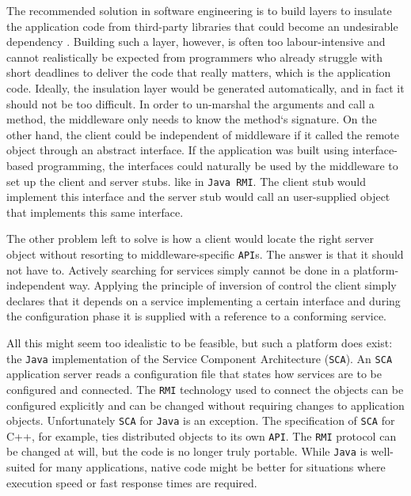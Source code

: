 The recommended solution in software engineering is to build layers to insulate
the application code from third-party libraries that could become an undesirable dependency \cite{Sommerville}.
Building such a layer, however, is often too labour-intensive and cannot realistically be expected from programmers
who already struggle with short deadlines to deliver the code that really matters, which is the application code.
Ideally, the insulation layer would be generated automatically, and in fact it should not be too difficult. In order
to un-marshal the arguments and call a method, the middleware only needs to know the method`s signature. On the
other hand, the client could be independent of middleware if it called the remote object through an abstract
interface. If the application was built using interface-based programming, \cite{Pugh} the interfaces could naturally
be used by the middleware to set up the client and server stubs. like in \texttt{\texttt{Java} \texttt{RMI}}. The client stub would
implement this interface and the server stub would call an user-supplied object that implements this same interface.

The other problem left to solve is how a client would locate the right server object without resorting to middleware-specific \texttt{API}s.
The answer is that it should not have to. Actively searching for services simply cannot be done in a platform-independent way.
Applying the principle of inversion of control \cite{Fowler2} the client simply declares that it depends on a service implementing
a certain interface and during the configuration phase it is supplied with a reference to a conforming service.

All this might seem too idealistic to be feasible, but such a platform does exist: the \texttt{Java} implementation of the Service Component
Architecture (\texttt{SCA}). An \texttt{SCA} application server reads a configuration file that states how services are to be configured
and connected. The \texttt{RMI} technology used to connect the objects can be configured explicitly and can be changed without requiring
changes to application objects. Unfortunately \texttt{SCA} for \texttt{Java} is an exception. The specification of \texttt{SCA} for C++, for example,
ties distributed objects to its own \texttt{API}. The \texttt{RMI} protocol can be changed at will, but the code is no longer truly portable.
While \texttt{Java} is well-suited for many applications, native code might be better for situations where execution speed or fast response
times are required.

